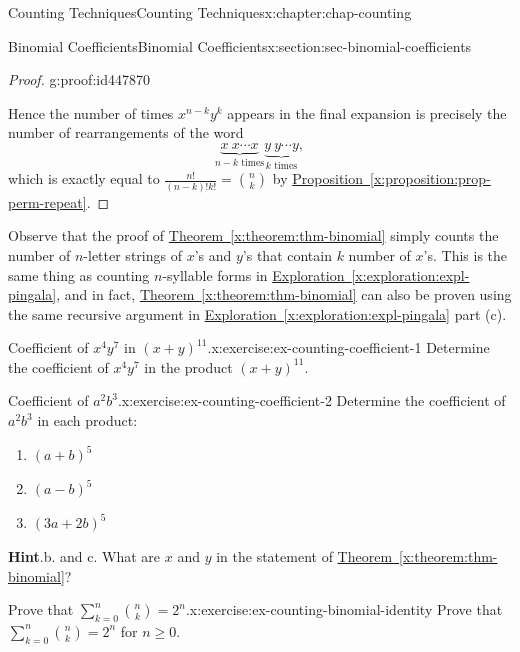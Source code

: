 \documentclass[oneside,10pt,]{book}
\newcommand{\blocktitlefont}{\relax}
\newcommand{\xreffont}{\relax}
\numberwithin{equation}{section}
\begin{document}
\begin{chapterptx}{Counting Techniques}{}{Counting Techniques}{}{}{x:chapter:chap-counting}
\begin{sectionptx}{Binomial Coefficients}{}{Binomial Coefficients}{}{}{x:section:sec-binomial-coefficients}
\begin{proof}{}{g:proof:id447870}
\par
Hence the number of times \(x^{n-k}y^k\) appears in the final expansion is precisely the number of rearrangements of the word%
\begin{equation*}
\underbrace{x\ x\cdots x}_\text{$n-k$ times}\underbrace{y\ y\cdots y}_\text{$k$ times},
\end{equation*}
which is exactly equal to \(\frac{n!}{(n-k)!k!} = \binom{n}{k}\) by \hyperref[x:proposition:prop-perm-repeat]{Proposition~{\xreffont\ref{x:proposition:prop-perm-repeat}}}.%
\end{proof}
Observe that the proof of \hyperref[x:theorem:thm-binomial]{Theorem~{\xreffont\ref{x:theorem:thm-binomial}}} simply counts the number of \(n\)-letter strings of \(x\)'s and \(y\)'s that contain \(k\) number of \(x\)'s. This is the same thing as counting \(n\)-syllable forms in \hyperref[x:exploration:expl-pingala]{Exploration~{\xreffont\ref{x:exploration:expl-pingala}}}, and in fact, \hyperref[x:theorem:thm-binomial]{Theorem~{\xreffont\ref{x:theorem:thm-binomial}}} can also be proven using the same recursive argument in \hyperref[x:exploration:expl-pingala]{Exploration~{\xreffont\ref{x:exploration:expl-pingala}}} part (c).%
\begin{inlineexercise}{Coefficient of \(x^4y^7\) in \((x+y)^{11}\).}{x:exercise:ex-counting-coefficient-1}%
Determine the coefficient of \(x^4y^7\) in the product \((x+y)^{11}\).%
\end{inlineexercise}
\begin{inlineexercise}{Coefficient of \(a^2b^3\).}{x:exercise:ex-counting-coefficient-2}%
Determine the coefficient of \(a^2b^3\) in each product:%
\begin{enumerate}[label=(\alph*)]
\item{}\(\displaystyle (a+b)^5\)%
\item{}\(\displaystyle (a-b)^5\)%
\item{}\(\displaystyle (3a+2b)^5\)%
\end{enumerate}
%
\par\smallskip%
\noindent\textbf{\blocktitlefont Hint}.\hypertarget{g:hint:id326315}{}\quad{}b. and c. What are \(x\) and \(y\) in the statement of \hyperref[x:theorem:thm-binomial]{Theorem~{\xreffont\ref{x:theorem:thm-binomial}}}?%
\end{inlineexercise}
\begin{inlineexercise}{Prove that \(\displaystyle\sum_{k=0}^n \binom{n}{k} = 2^n\).}{x:exercise:ex-counting-binomial-identity}%
Prove that \(\displaystyle\sum_{k=0}^n \binom{n}{k} = 2^n\) for \(n \geq 0\).%

\end{inlineexercise}
\end{sectionptx}
\end{chapterptx}
\end{document}
